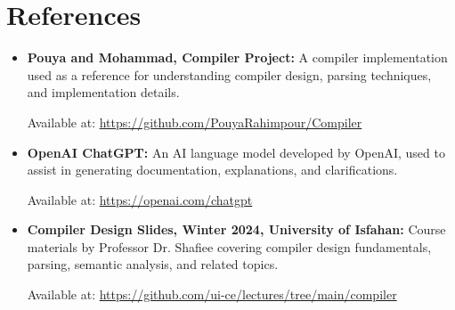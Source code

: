\documentclass[12pt, a4paper]{report}
\begin{document}
\chapter{References}

\begin{itemize}
    \item \textbf{Pouya and Mohammad, Compiler Project:}  
    A compiler implementation used as a reference for understanding compiler design, parsing techniques, and implementation details.  
    
    Available at: \url{https://github.com/PouyaRahimpour/Compiler}

    \item \textbf{OpenAI ChatGPT:}  
    An AI language model developed by OpenAI, used to assist in generating documentation, explanations, and clarifications.  
    
    Available at: \url{https://openai.com/chatgpt}

    \item \textbf{Compiler Design Slides, Winter 2024, University of Isfahan:}  
    Course materials by Professor Dr. Shafiee covering compiler design fundamentals, parsing, semantic analysis, and related topics.  
    
    Available at: \url{https://github.com/ui-ce/lectures/tree/main/compiler}
\end{itemize}
\end{document}
